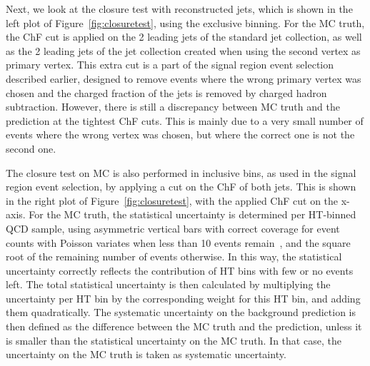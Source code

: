 Next, we look at the closure test with reconstructed jets, which is shown in the left plot of Figure~\ref{fig:closuretest}, using the exclusive binning. For the MC truth, the ChF cut is applied on the 2 leading jets of the standard jet collection, as well as the 2 leading jets of the jet collection created when using the second vertex as primary vertex. This extra cut is a part of the signal region event selection described earlier, designed to remove events where the wrong primary vertex was chosen and the charged fraction of the jets is removed by charged hadron subtraction. However, there is still a discrepancy between MC truth and the prediction at the tightest ChF cuts. This is mainly due to a very small number of events where the wrong vertex was chosen, but where the correct one is not the second one.

The closure test on MC is also performed in inclusive bins, as used in the signal region event selection, by applying a cut on the ChF of both jets. This is shown in the right plot of Figure~\ref{fig:closuretest}, with the applied ChF cut on the x-axis. For the MC truth, the statistical uncertainty is determined  per HT-binned QCD sample, using asymmetric vertical bars with correct coverage for event counts with Poisson variates when less than 10 events remain~\cite{PoissonErrorBars}, and the square root of the remaining number of events otherwise. In this way, the statistical uncertainty correctly reflects the contribution of HT bins with few or no events left. The total statistical uncertainty is then calculated by multiplying the uncertainty per HT bin by the corresponding weight for this HT bin, and adding them quadratically. The systematic uncertainty on the background prediction is then defined as the difference between the MC truth and the prediction, unless it is smaller than the statistical uncertainty on the MC truth. In that case, the uncertainty on the MC truth is taken as systematic uncertainty.

